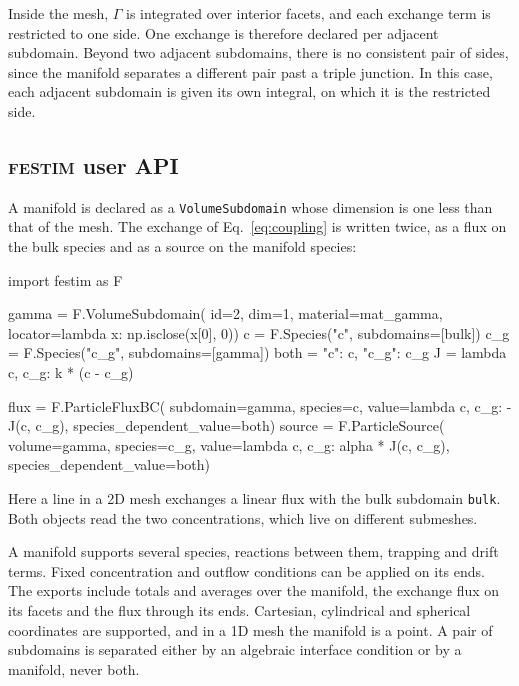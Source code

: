 \documentclass[5p]{elsarticle}
\newcommand{\FESTIM}{\textsc{festim}}
\begin{document}
Inside the mesh, $\Gamma$ is integrated over interior facets, and each exchange term is restricted to one side.
One exchange is therefore declared per adjacent subdomain.
Beyond two adjacent subdomains, there is no consistent pair of sides, since the manifold separates a different pair past a triple junction.
In this case, each adjacent subdomain is given its own integral, on which it is the restricted side.

\subsection{\FESTIM{} user API}
\label{sec:method:api}

A manifold is declared as a \texttt{VolumeSubdomain} whose dimension is one less than that of the mesh.
The exchange of Eq.~\ref{eq:coupling} is written twice, as a flux on the bulk species and as a source on the manifold species:
\begin{python}
import festim as F

gamma = F.VolumeSubdomain(
    id=2, dim=1, material=mat_gamma,
    locator=lambda x: np.isclose(x[0], 0))
c = F.Species("c", subdomains=[bulk])
c_g = F.Species("c_g", subdomains=[gamma])
both = {"c": c, "c_g": c_g}
J = lambda c, c_g: k * (c - c_g)

flux = F.ParticleFluxBC(
    subdomain=gamma, species=c,
    value=lambda c, c_g: -J(c, c_g),
    species_dependent_value=both)
source = F.ParticleSource(
    volume=gamma, species=c_g,
    value=lambda c, c_g: alpha * J(c, c_g),
    species_dependent_value=both)
\end{python}
Here a line in a 2D mesh exchanges a linear flux with the bulk subdomain \texttt{bulk}.
Both objects read the two concentrations, which live on different submeshes.

A manifold supports several species, reactions between them, trapping and drift terms.
Fixed concentration and outflow conditions can be applied on its ends.
The exports include totals and averages over the manifold, the exchange flux on its facets and the flux through its ends.
Cartesian, cylindrical and spherical coordinates are supported, and in a 1D mesh the manifold is a point.
A pair of subdomains is separated either by an algebraic interface condition or by a manifold, never both.

\end{document}
